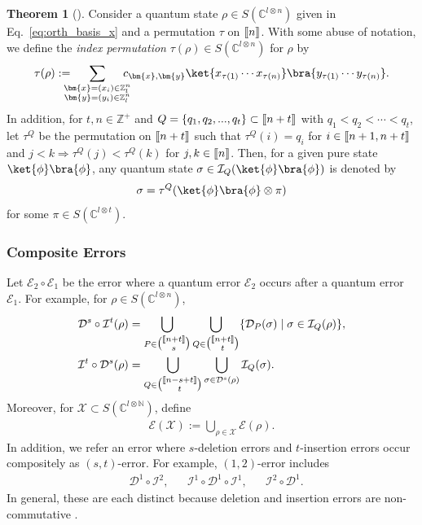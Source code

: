 \documentclass[reprint,amsmath,amssymb,aps,]{revtex4-2}
\theoremstyle{definition}
\newtheorem{theo}{Theorem}
\newcommand{\SET}[1]{\mathbb{#1}}
\newcommand{\N}{\SET{N}}
\newcommand{\C}{\SET{C}}
\newcommand{\1}{\mbox{1}\hspace{-0.25em}\mbox{l}}%
\newcommand{\setint}[1]{[\hspace{-0.5mm}[#1]\hspace{-0.5mm}]}
\newcommand{\subint}[2]{\tbinom{\setint{#1}}{#2}}
\newcommand{\pure}[2]{\C^{#1 \otimes #2}}
\newcommand{\state}[2]{S(\pure{#1}{#2})}
\newcommand{\QU}[1]{\mathcal{#1}}
\begin{document}
\begin{theo}[\cite{sibayama_single_ins_def}]
  \label{theo:after_ins}
  Consider
  a quantum state $\rho \in \state{l}{n}$ given in Eq.~\eqref{eq:orth_basis_x}
  and
  a permutation $\tau$ on $\setint{n}$.
  With some abuse of notation,
  we define the {\it index permutation} $\tau(\rho) \in \state{l}{n}$ for $\rho$ by
  \begin{align*}
    \tau(\rho)
    :=
    \hspace{-3mm}
    \sum_{\substack{\bm{x}=(x_i) \in \mathbb{Z}_l^n\\\bm{y}=(y_i) \in \mathbb{Z}_l^n}}
    \hspace{-3mm}
    c_{\bm{x},\bm{y}}
    \ket{x_{\tau(1)} \cdots x_{\tau(n)}}\bra{y_{\tau(1)} \cdots y_{\tau(n)}}.
  \end{align*}
  In addition,
  for $t,n \in \mathbb{Z}^+$ and
  $Q = \{ q_1, q_2, ..., q_t \} \subset \setint{n+t}$ with $q_1 < q_2 < \cdots < q_t$,
  let $\tau^Q$ be the permutation on $\setint{n+t}$
  such that $\tau^Q(i)=q_i$ for $i \in \setint{n+1,n+t}$ and
  $j < k \Rightarrow \tau^Q(j) < \tau^Q(k)$ for $j,k \in \setint{n}$.
  Then,
  for a given pure state $\ket{\phi}\bra{\phi}$,
  any quantum state $\sigma \in \QU{I}_{Q}( \ket{\phi}\bra{\phi} )$ is denoted by
  \begin{align}
    \sigma
    =
    \tau^Q (\ket{\phi}\bra{\phi} \otimes \pi)
    \label{eq:pure_ins}
  \end{align}
  for some $\pi \in \state{l}{t}$.
\end{theo}

\subsubsection{Composite Errors}
Let $\QU{E}_2 \circ \QU{E}_1$ be
the error where a quantum error $\QU{E}_2$ occurs after a quantum error $\QU{E}_1$.
For example,
for $\rho \in \state{l}{n}$,
\begin{align*}
  \QU{D}^s \circ \QU{I}^t( \rho )
  &=
  \bigcup_{P \in \subint{n+t}{s}}
  \bigcup_{Q \in \subint{n+t}{t}}
  \{
  \QU{D}_P (\sigma)
  \mid
  \sigma \in \QU{I}_Q (\rho)
  \},\\
  \QU{I}^t \circ \QU{D}^s( \rho )
  &=
  \bigcup_{Q \in \subint{n-s+t}{t}}
  \bigcup_{\sigma \in \QU{D}^s (\rho)}
  \QU{I}_Q (\sigma).
\end{align*}
Moreover,
for $\QU{X} \subset \state{l}{\N}$,
define
\begin{align*}
  \QU{E}(\QU{X})
  :=
  \bigcup_{ \rho \in \QU{X} }
  \QU{E}(\rho).
\end{align*}
In addition,
we refer
an error where $s$-deletion errors and $t$-insertion errors occur compositely
as $(s,t)$-error.
For example,
$(1,2)$-error includes
\begin{align*}
  &\QU{D}^1 \circ \QU{I}^2,
  &&\QU{I}^1 \circ \QU{D}^1 \circ \QU{I}^1,
  &&\QU{I}^2 \circ \QU{D}^1.
\end{align*}
In general,
these are each distinct
because
deletion and insertion errors are non-commutative \cite{hagiwara2024introduction}.
\end{document}
